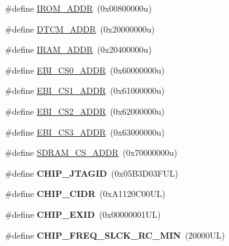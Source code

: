 \begin{DoxyCompactItemize}
\item 
\#define \mbox{\hyperlink{group__SAMS70N20__definitions_ga694212ffb8c2786bacee3d0ad6020bda}{I\+R\+O\+M\+\_\+\+A\+D\+DR}}~(0x00800000u)
\item 
\#define \mbox{\hyperlink{group__SAMS70N20__definitions_ga26626a425f7ebb3a0c2dbc276f0d9f78}{D\+T\+C\+M\+\_\+\+A\+D\+DR}}~(0x20000000u)
\item 
\#define \mbox{\hyperlink{group__SAMS70N20__definitions_gaae45ac2ef16942159481c767ac4805cf}{I\+R\+A\+M\+\_\+\+A\+D\+DR}}~(0x20400000u)
\item 
\#define \mbox{\hyperlink{group__SAMS70N20__definitions_ga9bcbb97ddae3b2cc5e2c9613d33f66b4}{E\+B\+I\+\_\+\+C\+S0\+\_\+\+A\+D\+DR}}~(0x60000000u)
\item 
\#define \mbox{\hyperlink{group__SAMS70N20__definitions_gaaddd9fdbbc77c9aced5308819f502a26}{E\+B\+I\+\_\+\+C\+S1\+\_\+\+A\+D\+DR}}~(0x61000000u)
\item 
\#define \mbox{\hyperlink{group__SAMS70N20__definitions_ga058a35f9991487dc2dd12ada792d0730}{E\+B\+I\+\_\+\+C\+S2\+\_\+\+A\+D\+DR}}~(0x62000000u)
\item 
\#define \mbox{\hyperlink{group__SAMS70N20__definitions_gad66ebdd0fc33ec3cf85dbaa14bbf05d9}{E\+B\+I\+\_\+\+C\+S3\+\_\+\+A\+D\+DR}}~(0x63000000u)
\item 
\#define \mbox{\hyperlink{group__SAMS70N20__definitions_ga61b7db25daf759c2a2beb6e5a0b57a84}{S\+D\+R\+A\+M\+\_\+\+C\+S\+\_\+\+A\+D\+DR}}~(0x70000000u)
\item 
\mbox{\label{group__SAMS70N20__definitions_gaa614519778eec0df55d3eeab3223e3f6}} 
\#define {\bfseries C\+H\+I\+P\+\_\+\+J\+T\+A\+G\+ID}~(0x05\+B3\+D03\+F\+U\+L)
\item 
\mbox{\label{group__SAMS70N20__definitions_ga1e1ae44dd9269a8a98c1d7e7a60e9fbd}} 
\#define {\bfseries C\+H\+I\+P\+\_\+\+C\+I\+DR}~(0x\+A1120\+C00\+U\+L)
\item 
\mbox{\label{group__SAMS70N20__definitions_ga35123717aa86b76bb6b73cf3adc4c2e6}} 
\#define {\bfseries C\+H\+I\+P\+\_\+\+E\+X\+ID}~(0x00000001\+U\+L)
\item 
\mbox{\label{group__SAMS70N20__definitions_ga0e868bf27426399dfdcb3a9dfc3733c4}} 
\#define {\bfseries C\+H\+I\+P\+\_\+\+F\+R\+E\+Q\+\_\+\+S\+L\+C\+K\+\_\+\+R\+C\+\_\+\+M\+IN}~(20000\+U\+L)

\end{DoxyCompactItemize}
